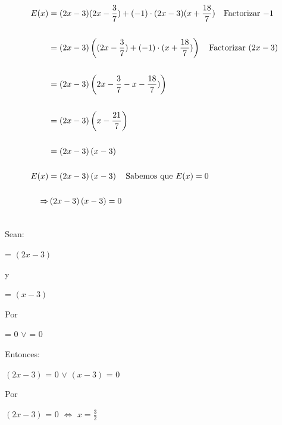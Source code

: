 \documentclass[12pt]{article}
\begin{document}
\begin{equation*}
    \begin{split}
      E(x) & = (2x-3)(2x-\frac{3}{7})+(-1)\cdot(2x-3)(x+\frac{18}{7}) \quad \textup{Factorizar $-1$} \\\\ 
      & = (2x-3)\left((2x-\frac{3}{7})+(-1)\cdot(x+\frac{18}{7})\right) \quad \textup{Factorizar $(2x-3)$}\\\\
      & = (2x-3)\left(2x-\frac{3}{7}-x-\frac{18}{7})\right)\\\\
      & = \left(2x-3\right)\left(x-\frac{21}{7}\right)\\\\
     & = \left(2x-3\right)\left(x-3\right)\\\\
      E(x) & =\left(2x-3\right)\left(x-3\right) \quad \textup{Sabemos que $E(x)= 0$} \\\\
      \Rightarrow & \left(2x-3\right)\left(x-3\right) = 0 \quad \\\\
    \end{split}
\end{equation*}

Sean: 
\begin{center}
   {} = $\left(2x-3\right)$   
\end{center}

\begin{center}
    y
\end{center}

\begin{center}
   {} = $\left(x-3\right)$   
\end{center}
    
Por {}
\begin{center}
   {} = $0$  $\vee$ {} = $0$   
\end{center}

Entonces:

\begin{center}
   
   $\left(2x-3\right)$ = $0$  $\vee$ $\left(x-3\right)$ = $0$   
   
\end{center}

Por {}

\begin{center}
   
   $\left(2x-3\right)$ = $0$ $\Leftrightarrow$ $ x=\frac{3}{2} $ 
   
\end{center}
\end{document}

